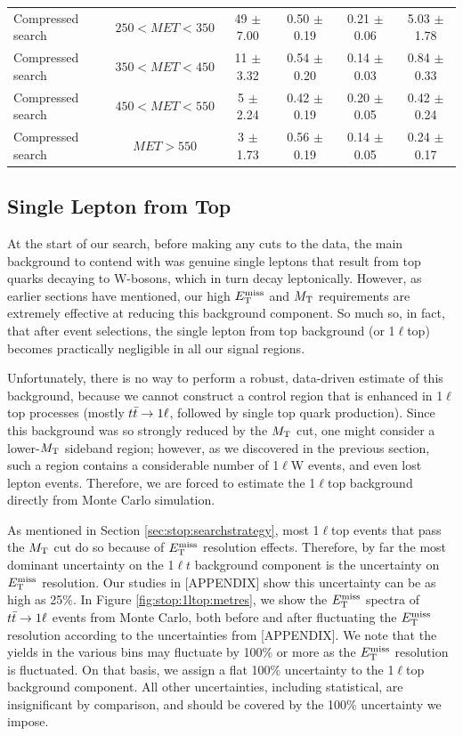 \begin{table}
\begin{tabular}{|l|c|c|c|c|c|}
\hline
Compressed search & $250<MET<350$  & 49 $\pm$ 7.00  & 0.50 $\pm$ 0.19  & 0.21 $\pm$ 0.06  & 5.03 $\pm$ 1.78  \\
Compressed search & $350<MET<450$  & 11 $\pm$ 3.32  & 0.54 $\pm$ 0.20  & 0.14 $\pm$ 0.03  & 0.84 $\pm$ 0.33  \\
Compressed search & $450<MET<550$  & 5 $\pm$ 2.24   & 0.42 $\pm$ 0.19  & 0.20 $\pm$ 0.05  & 0.42 $\pm$ 0.24  \\
Compressed search & $MET>550$      & 3 $\pm$ 1.73  & 0.56 $\pm$ 0.19  & 0.14 $\pm$ 0.05  & 0.24 $\pm$ 0.17  \\
\hline
\end{tabular}
\end{table}

\subsection{Single Lepton from Top}
\label{ssec:stop:1ltop}

At the start of our search, before making any cuts to the data, the
main background to contend with was genuine single leptons that result
from top quarks decaying to W-bosons, which in turn decay
leptonically. However, as earlier sections have mentioned, our high
$E_\text{T}^\text{miss}$ and $M_\text{T}$ requirements are extremely effective at reducing this
background component. So much so, in fact, that after event
selections, the single lepton from top background (or 1$\ell$top) becomes
practically negligible in all our signal regions.

Unfortunately, there is no way to perform a robust, data-driven
estimate of this background, because we cannot construct a control
region that is enhanced in 1$\ell$top processes (mostly $t\bar{t} \rightarrow 1\ell$,
followed by single top quark production). Since this background was so
strongly reduced by the $M_\text{T}$ cut, one might consider a lower-$M_\text{T}$
sideband region; however, as we discovered in the previous section,
such a region contains a considerable number of 1$\ell$W events, and
even lost lepton events. Therefore, we are forced to estimate the
1$\ell$top background directly from Monte Carlo simulation.

As mentioned in Section \ref{sec:stop:searchstrategy}, most 1$\ell$top
events that pass the $M_\text{T}$ cut do so because of $E_\text{T}^\text{miss}$ resolution
effects. Therefore, by far the most dominant uncertainty on the 1$\ell
t$ background component is the uncertainty on $E_\text{T}^\text{miss}$ resolution. Our
studies in [APPENDIX] show this uncertainty can be as high as 25\%. In
Figure \ref{fig:stop:1ltop:metres}, we show the $E_\text{T}^\text{miss}$ spectra of
$t\bar{t} \rightarrow 1\ell$ events from Monte Carlo, both before and after fluctuating
the $E_\text{T}^\text{miss}$ resolution according to the uncertainties from
[APPENDIX]. We note that the yields in the various bins may fluctuate
by 100\% or more as the $E_\text{T}^\text{miss}$ resolution is fluctuated. On that
basis, we assign a flat 100\% uncertainty to the 1$\ell$top background
component. All other uncertainties, including statistical, are
insignificant by comparison, and should be covered by the 100\%
uncertainty we impose.

